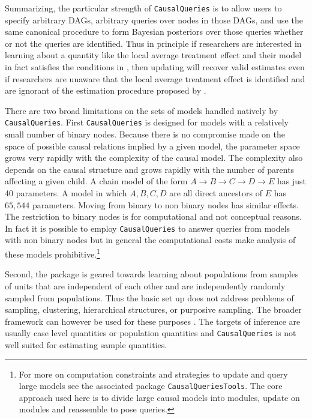 \documentclass[
  11pt,
  article]{jss}
\begin{document}
Summarizing, the particular strength of \texttt{CausalQueries} is to
allow users to specify arbitrary DAGs, arbitrary queries over nodes in
those DAGs, and use the same canonical procedure to form Bayesian
posteriors over those queries whether or not the queries are identified.
Thus in principle if researchers are interested in learning about a
quantity like the local average treatment effect and their model in fact
satisfies the conditions in \citet{angrist_identification_1996}, then
updating will recover valid estimates even if researchers are unaware
that the local average treatment effect is identified and are ignorant
of the estimation procedure proposed by
\citet{angrist_identification_1996}.

There are two broad limitations on the sets of models handled natively
by \texttt{CausalQueries}. First \texttt{CausalQueries} is designed for
models with a relatively small number of binary nodes. Because there is
no compromise made on the space of possible causal relations implied by
a given model, the parameter space grows very rapidly with the
complexity of the causal model. The complexity also depends on the
causal structure and grows rapidly with the number of parents affecting
a given child. A chain model of the form
\(A \rightarrow B \rightarrow C \rightarrow D \rightarrow E\) has just
40 parameters. A model in which \(A, B, C, D\) are all direct ancestors
of \(E\) has \(65,544\) parameters. Moving from binary to non binary
nodes has similar effects. The restriction to binary nodes is for
computational and not conceptual reasons. In fact it is possible to
employ \texttt{CausalQueries} to answer queries from models with non
binary nodes but in general the computational costs make analysis of
these models prohibitive.\footnote{For more on computation constraints
  and strategies to update and query large models see the associated
  package \texttt{CausalQueriesTools}. The core approach used here is to
  divide large causal models into modules, update on modules and
  reassemble to pose queries.}

Second, the package is geared towards learning about populations from
samples of units that are independent of each other and are
independently randomly sampled from populations. Thus the basic set up
does not address problems of sampling, clustering, hierarchical
structures, or purposive sampling. The broader framework can however be
used for these purposes \citep[see section 9.4
of][]{humphreys_integrated_2023}. The targets of inference are usually
case level quantities or population quantities and
\texttt{CausalQueries} is not well suited for estimating sample
quantities.
\end{document}

